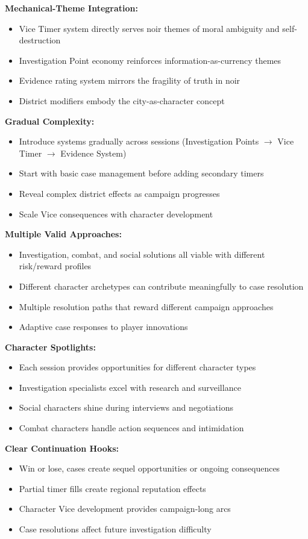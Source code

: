 \documentclass[11pt]{article}
\begin{document}
\textbf{Mechanical-Theme Integration:}
\begin{itemize}
\item Vice Timer system directly serves noir themes of moral ambiguity and self-destruction
\item Investigation Point economy reinforces information-as-currency themes
\item Evidence rating system mirrors the fragility of truth in noir
\item District modifiers embody the city-as-character concept
\end{itemize}

\textbf{Gradual Complexity:}
\begin{itemize}
\item Introduce systems gradually across sessions (Investigation Points $\rightarrow$ Vice Timer $\rightarrow$ Evidence System)
\item Start with basic case management before adding secondary timers
\item Reveal complex district effects as campaign progresses
\item Scale Vice consequences with character development
\end{itemize}

\textbf{Multiple Valid Approaches:}
\begin{itemize}
\item Investigation, combat, and social solutions all viable with different risk/reward profiles
\item Different character archetypes can contribute meaningfully to case resolution
\item Multiple resolution paths that reward different campaign approaches
\item Adaptive case responses to player innovations
\end{itemize}

\textbf{Character Spotlights:}
\begin{itemize}
\item Each session provides opportunities for different character types
\item Investigation specialists excel with research and surveillance
\item Social characters shine during interviews and negotiations
\item Combat characters handle action sequences and intimidation
\end{itemize}

\textbf{Clear Continuation Hooks:}
\begin{itemize}
\item Win or lose, cases create sequel opportunities or ongoing consequences
\item Partial timer fills create regional reputation effects
\item Character Vice development provides campaign-long arcs
\item Case resolutions affect future investigation difficulty
\end{itemize}
\end{document}
